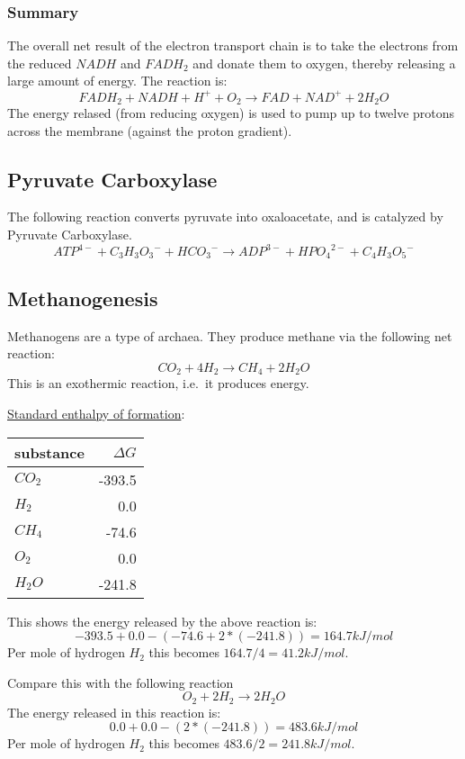 \documentclass{article}
\begin{document}
\subsubsection{Summary}
The overall net result of the electron transport chain is to take the electrons from the
reduced $NADH$ and $FADH_2$ and donate them to oxygen, thereby releasing a large amount of
energy. The reaction is:
\[
    FADH_2 + NADH + H^+ + O_2 \rightarrow FAD + NAD^+ + 2H_2O
\]
The energy relased (from reducing oxygen) is used to pump up to twelve protons across the
membrane (against the proton gradient).


\subsection{Pyruvate Carboxylase}
The following reaction converts pyruvate into oxaloacetate, and is catalyzed by Pyruvate
Carboxylase.
\[
    {ATP}^{4-} + {C_3H_3O_3}^- + {HCO_3}^- \rightarrow
    {ADP}^{3-} + {HPO_4}^{2-} + {C_4H_3O_5}^-
\]

\subsection{Methanogenesis}
Methanogens are a type of archaea. They produce methane via the following net reaction:
\[
    CO_2 + 4H_2 \rightarrow CH_4 + 2H_2O
\]
This is an exothermic reaction, i.e.\ it produces energy.

\href{https://en.wikipedia.org/wiki/Standard_enthalpy_of_formation}{Standard enthalpy of
formation}:

\begin{tabular}{l  r}         \toprule
    substance & $\Delta G$ \\ \midrule
    $CO_2$    & -393.5     \\
    $H_2$     & 0.0        \\
    $CH_4$    & -74.6      \\
    $O_2$     & 0.0        \\
    $H_2O$    & -241.8     \\ \bottomrule
\end{tabular}

This shows the energy released by the above reaction is:
\[
    -393.5 + 0.0 - (-74.6 + 2*(-241.8)) = 164.7 kJ/mol
\]
Per mole of hydrogen $H_2$ this becomes $164.7/4 = 41.2 kJ/mol$.

Compare this with the following reaction
\[
    O_2 + 2H_2 \rightarrow 2H_2O
\]
The energy released in this reaction is:
\[
    0.0 + 0.0 - (2*(-241.8)) = 483.6 kJ/mol
\]
Per mole of hydrogen $H_2$ this becomes $483.6/2 = 241.8 kJ/mol$.
\end{document}
